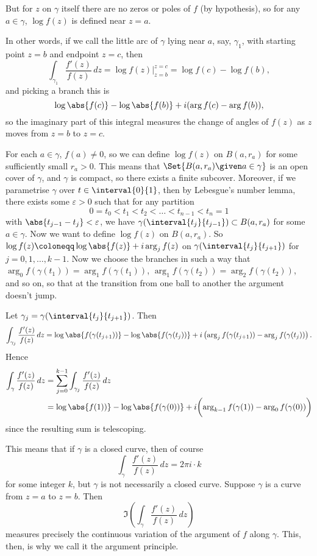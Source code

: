 But for $z$ on $\gamma$ itself there are no zeros or poles of $f$ (by hypothesis), so for any $a \in \gamma$, $\log f(z)$ is defined near $z = a$.

In other words, if we call the little arc of $\gamma$ lying near $a$, say, $\gamma_1$, with starting point $z = b$ and endpoint $z = c$, then
\[
	\int_{\gamma_1} \frac{f'(z)}{f(z)} \, d z = \log f(z) \biggr\rvert_{z = b}^{z = c} = \log f(c) - \log f(b),
\]
and picking a branch this is
\[
	\log \abs{f(c)} - \log \abs{f(b)} + i (\arg f(c) - \arg f(b)),
\]
so the imaginary part of this integral measures the change of angles of $f(z)$ as $z$ moves from $z = b$ to $z = c$.

For each $a \in \gamma$, $f(a) \neq 0$, so we can define $\log f(z)$ on $B(a, r_a)$ for some sufficiently small $r_a > 0$.
This means that $\Set{B(a, r_a) \given a \in \gamma}$ is an open cover of $\gamma$, and $\gamma$ is compact, so there exists a finite subcover.
Moreover, if we parametrise $\gamma$ over $t \in \interval{0}{1}$, then by Lebesgue's number lemma, there exists some $\varepsilon > 0$ such that for any partition
\[
	0 = t_0 < t_1 < t_2 < \dots < t_{n - 1} < t_n = 1
\]
with $\abs{t_{j - 1} - t_j} < \varepsilon$, we have $\gamma(\interval{t_j}{t_{j - 1}}) \subset B(a, r_a)$ for some $a \in \gamma$.
Now we want to define $\log f(z)$ on $B(a, r_a)$.
So $\log f(z) \coloneqq \log \abs{f(z)} + i \arg_j f(z)$ on $\gamma(\interval{t_j}{t_{j + 1}})$ for $j = 0, 1, \dots, k - 1$.
Now we choose the branches in such a way that $\arg_0 f(\gamma(t_1)) = \arg_1 f(\gamma(t_1))$, $\arg_1 f(\gamma(t_2)) = \arg_2 f(\gamma(t_2))$, and so on, so that at the transition from one ball to another the argument doesn't jump.

Let $\gamma_j = \gamma(\interval{t_j}{t_{j + 1}})$.
Then
\[
	\int_{\gamma_j} \frac{f'(z)}{f(z)} \, d z = \log \abs{f(\gamma(t_{j + 1}))} - \log \abs{f(\gamma(t_j))} + i \left ( \arg_j f(\gamma(t_{j + 1})) - \arg_j f(\gamma(t_j)) \right ).
\]
Hence
\begin{align*}
	\int_\gamma \frac{f'(z)}{f(z)} \, d z &= \sum_{j = 0}^{k - 1} \int_{\gamma_j} \frac{f'(z)}{f(z)} \, d z \\
	&= \log\abs{f(1))} - \log\abs{f(\gamma(0))} + i \biggl ( \arg_{k - 1} f(\gamma(1)) - \arg_0 f(\gamma(0)) \biggr )
\end{align*}
since the resulting sum is telescoping.

This means that if $\gamma$ is a closed curve, then of course
\[
	\int_\gamma \frac{f'(z)}{f(z)} \, d z = 2 \pi i \cdot k
\]
for some integer $k$, but $\gamma$ is not necessarily a closed curve.
Suppose $\gamma$ is a curve from $z = a$ to $z = b$.
Then
\[
	\Im \left ( \int_\gamma \frac{f'(z)}{f(z)} \, d z \right )
\]
measures precisely the continuous variation of the argument of $f$ along $\gamma$.
This, then, is why we call it the argument principle.

